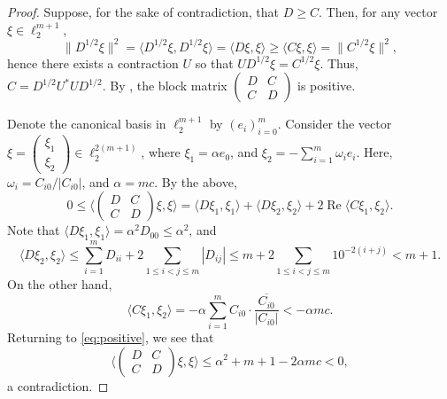 \documentclass[12pt]{amsart}
\theoremstyle{plain}
\theoremstyle{definition}
\renewcommand{\leq}{\leqslant}
\renewcommand{\geq}{\geqslant}\usepackage{amssymb}
\DeclareMathOperator{\re}{Re}
\begin{document}
\begin{proof}
Suppose, for the sake of contradiction, that $D \geq C$.
Then, for any vector $\xi \in \ell_2^{m+1}$,
$$
\|D^{1/2} \xi\|^2 = \langle D^{1/2} \xi, D^{1/2} \xi \rangle =
\langle D \xi, \xi \rangle \geq \langle C \xi, \xi \rangle =
\|C^{1/2} \xi\|^2 ,
$$
hence there exists a contraction $U$ so that $U D^{1/2} \xi = C^{1/2} \xi$.
Thus, $C = D^{1/2} U^* U D^{1/2}$. By \cite[Lemma 1.21]{Zh}, the
block matrix $\begin{pmatrix} D & C \\ C & D \end{pmatrix}$ is positive.

Denote the canonical basis in $\ell_2^{m+1}$ by $(e_i)_{i=0}^m$. Consider
the vector $\xi = \begin{pmatrix} \xi_1 \\ \xi_2 \end{pmatrix} \in \ell_2^{2(m+1)}$,
where $\xi_1 = \alpha e_0$, and $\xi_2 = - \sum_{i=1}^m \omega_i e_i$.
Here, $\omega_i = C_{i0}/|C_{i0}|$, and
$\alpha = mc$. By the above,
\begin{equation}
0 \leq
\Big\langle \begin{pmatrix} D & C \\ C & D \end{pmatrix} \xi, \xi \Big\rangle =
\langle D \xi_1, \xi_1 \rangle + \langle D \xi_2, \xi_2 \rangle +
2 \re \langle C \xi_1, \xi_2 \rangle .
\label{eq:positive}
\end{equation}
Note that $\langle D \xi_1, \xi_1 \rangle = \alpha^2 D_{00} \leq \alpha^2$, and
$$
\langle D \xi_2, \xi_2 \rangle \leq
\sum_{i=1}^m D_{ii} + 2 \sum_{1 \leq i < j \leq m} |D_{ij}| \leq
m + 2 \sum_{1 \leq i < j \leq m} 10^{-2(i+j)} < m + 1 .
$$
On the other hand,
$$
\langle C \xi_1, \xi_2 \rangle =
- \alpha \sum_{i=1}^m C_{i0} \cdot \overline{\frac{C_{i0}}{|C_{i0}|}} <
- \alpha m c .
$$
Returning to \eqref{eq:positive}, we see that
$$
\Big\langle \begin{pmatrix} D & C \\ C & D \end{pmatrix} \xi, \xi \Big\rangle \leq
\alpha^2 + m + 1 - 2 \alpha mc < 0,
$$
a contradiction.
\end{proof}
\end{document}
